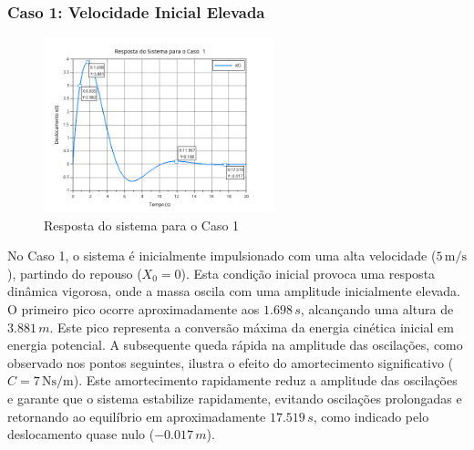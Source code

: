 \subsubsection{Caso 1: Velocidade Inicial Elevada}
\begin{figure}[H]
    \centering
    \includegraphics[width=0.6\textwidth]{atividades/1-atividade/assets/caso1.png}
    \caption{Resposta do sistema para o Caso 1}
\end{figure}
No Caso 1, o sistema é inicialmente impulsionado com uma alta velocidade (\(5 \, \text{m/s}\)), partindo do repouso (\(X_0 = 0\)). Esta condição inicial provoca uma resposta dinâmica vigorosa, onde a massa oscila com uma amplitude inicialmente elevada. O primeiro pico ocorre aproximadamente aos \(1.698 \, s\), alcançando uma altura de \(3.881 \, m\). Este pico representa a conversão máxima da energia cinética inicial em energia potencial. A subsequente queda rápida na amplitude das oscilações, como observado nos pontos seguintes, ilustra o efeito do amortecimento significativo (\(C = 7 \, \text{Ns/m}\)). Este amortecimento rapidamente reduz a amplitude das oscilações e garante que o sistema estabilize rapidamente, evitando oscilações prolongadas e retornando ao equilíbrio em aproximadamente \(17.519 \, s\), como indicado pelo deslocamento quase nulo (\(-0.017 \, m\)).

